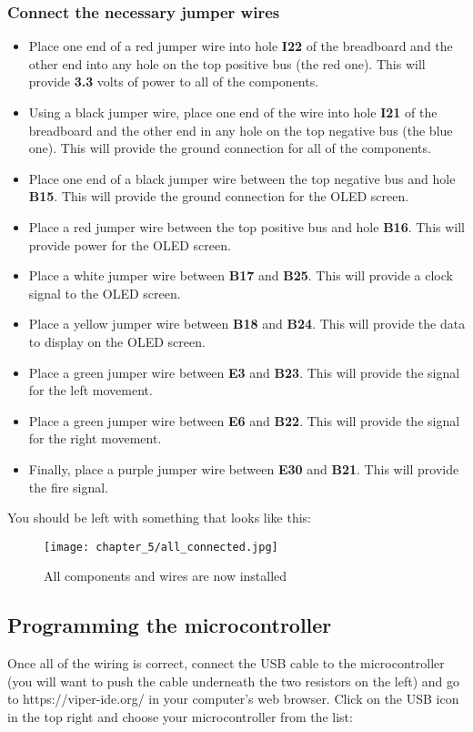 \subsubsection{Connect the necessary jumper wires}
\begin{itemize}
    \item Place one end of a red jumper wire into hole \textbf{I22} of the breadboard and the other end into
    any hole on the top positive bus (the red one). This will provide \textbf{3.3} volts of power to all of the components.
    \item Using a black jumper wire, place one end of the wire into hole \textbf{I21} of the breadboard and the other
    end in any hole on the top negative bus (the blue one). This will provide the ground connection for all of the components.
    \item Place one end of a black jumper wire between the top negative bus and hole \textbf{B15}. This will provide the ground connection
    for the OLED screen.
    \item Place a red jumper wire between the top positive bus and hole \textbf{B16}. This will provide power for the OLED screen.
    \item Place a white jumper wire between \textbf{B17} and \textbf{B25}. This will provide a clock signal to the OLED screen.
    \item Place a yellow jumper wire between \textbf{B18} and \textbf{B24}. This will provide the data to display on the OLED screen.
    \item Place a green jumper wire between \textbf{E3} and \textbf{B23}. This will provide the signal for the left movement.
    \item Place a green jumper wire between \textbf{E6} and \textbf{B22}. This will provide the signal for the right movement.
    \item Finally, place a purple jumper wire between \textbf{E30} and \textbf{B21}. This will provide the fire signal.
\end{itemize}

You should be left with something that looks like this:
\begin{figure}[H]
    \centering
    \texttt{[image: chapter\_5/all\_connected.jpg]}
    \caption{All components and wires are now installed}
\end{figure}

\subsection{Programming the microcontroller}
Once all of the wiring is correct, connect the USB cable to the microcontroller (you will want to push the cable underneath the
two resistors on the left) and go to https://viper-ide.org/ in your computer's web browser. Click on the USB icon in the top
right and choose your microcontroller from the list:


